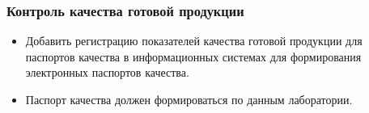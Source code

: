  \subsubsection{Контроль качества готовой продукции}

 \begin{itemize}

 \item Добавить регистрацию показателей качества готовой продукции для паспортов качества в информационных системах для формирования электронных паспортов качества.
 \item Паспорт качества должен формироваться по данным лаборатории.
\end{itemize}




